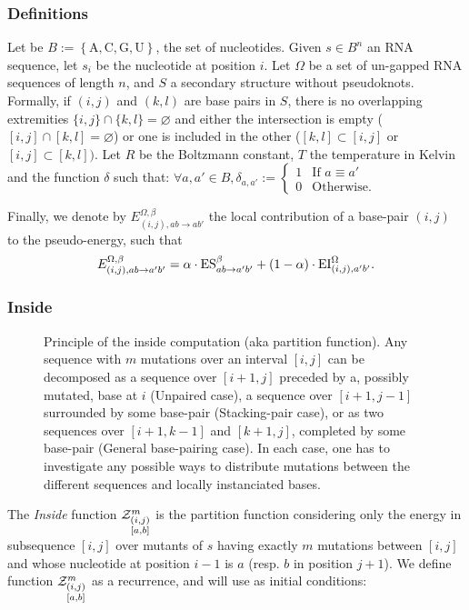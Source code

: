 \subsubsection{Definitions}
Let be $B:=\left\{\text{A},\text{C},\text{G},\text{U}\right\}$, the set of nucleotides.
Given $s\in B^n$ an RNA sequence, let $s_i$ be the nucleotide at position $i$. Let $\Omega$ be a set of un-gapped RNA sequences of
length $n$, and $S$ a secondary structure without pseudoknots. 
Formally, if $(i,j)$ and $(k,l)$ are base pairs in $S$, there is no overlapping extremities
 $\{i,j\}\cap \{k,l\}=\varnothing$ and either the intersection is empty 
 ($[i,j]\cap[k,l]=\varnothing$) or one is included in the other ($[k,l]\subset[i,j]$ or 
 $[i,j]\subset[k,l])$. Let $R$ be the Boltzmann constant, $T$ the temperature in Kelvin and
  the function $\delta$ such that: 
 $\forall a,a' \in B, \delta_{a,a'}:=\left\{\begin{array}{ll}
															1 & \text{If } a\equiv a'\\
															0 & \text{Otherwise.}
														\end{array}\right.$

Finally, we denote by $E_{(i,j),ab \to ab'}^{\Omega,\beta}$ the local contribution of a base-pair $(i,j)$ to the pseudo-energy, such that
\begin{equation}
  E_{(i,j),ab \to a'b'}^{\Omega,\beta}  = \alpha \cdot\text{ES}^\beta_{a b \to a' b'}+(1-\alpha)\cdot\text{EI}^{\Omega}_{(i,j),a'b'}.
\end{equation}


\subsubsection{Inside}
\begin{figure}
\resizebox{\textwidth}{!}{}
\caption{Principle of the inside computation (aka partition function). Any sequence with $m$ mutations over an interval $[i,j]$ 
can be decomposed as a sequence over $[i+1,j]$ preceded by a, possibly mutated, base at $i$ 
(Unpaired case), a sequence over $[i+1,j-1]$ surrounded by some base-pair (Stacking-pair case), 
or as two sequences over $[i+1,k-1]$ and $[k+1,j]$, completed by some base-pair (General base-pairing case). 
In each case, one has to investigate any possible ways to distribute mutations between the different sequences 
and locally instanciated bases.}
\end{figure}

The \emph{Inside} function $\Z{i,j}{m}{a,b}$ is the partition function considering only the 
energy in subsequence $[i,j]$ over mutants of $s$ having exactly $m$ mutations between $[i,j]$ and whose nucleotide at position $i-1$ is $a$ (resp. $b$ in position $j+1$).
We define function $\Z{i,j}{m}{a,b}$ as a recurrence, and will use as initial conditions:

